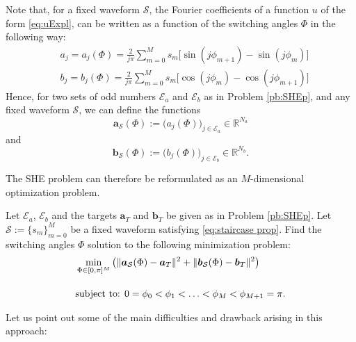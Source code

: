\documentclass[twocolumn]{autart}    %
\begin{document}
Note that, for a fixed waveform $\mathcal{S}$, the Fourier coefficients of a function $u$ of the form \eqref{eq:uExpl}, can be written as a function of the switching angles $\Phi$ in the following way:
\begin{align*}
	& a_j = a_j(\Phi) =  \frac{2}{j\pi} \sum_{m=0}^{M} s_m \Big[\sin(j\phi_{m+1}) -\sin(j\phi_{m})\Big]
	\\
	& b_j = b_j(\Phi) = \frac{2}{j\pi} \sum_{m=0}^{M} s_m \Big[\cos(j\phi_{m}) -\cos(j\phi_{m+1})\Big]
\end{align*}
Hence,  for  two sets of odd numbers $\mathcal{E}_a$ and $\mathcal{E}_b$ as in Problem \ref{pb:SHEp},  and any fixed waveform $\mathcal{S}$, we can define the functions
\begin{equation}\label{a function of phi}
\bm{a}_\mathcal{S} (\Phi) := \big(a_j (\Phi)\big)_{j\in \mathcal{E}_a} \in \mathbb{R}^{N_a}
\end{equation}
and
\begin{equation}\label{a function of phi}
\bm{b}_\mathcal{S} (\Phi) := \big(b_j (\Phi)\big)_{j\in \mathcal{E}_b} \in \mathbb{R}^{N_b}.
\end{equation}

The SHE problem can therefore be reformulated as an $M$-dimensional optimization problem.

\bigskip

\begin{problem}\label{pb:SHE opt}
Let $\mathcal{E}_a$, $\mathcal{E}_b$ and the targets $\bm{a}_T$ and $\bm{b}_T$ be given as in Problem \ref{pb:SHEp}.  Let $\mathcal S := \{ s_m\}_{m=0}^M$ be a fixed waveform satisfying \eqref{eq:staircase prop}.  Find the switching angles $\Phi$ solution to the following minimization problem:
\begin{align}
	&\min_{\Phi \in [0,\pi]^{M}} \left( \|\bm{a}_\mathcal{S} (\Phi) - \bm{a}_T\|^2 + \| \bm{b}_\mathcal{S} (\Phi) - \bm{b}_T\|^2\right)\notag 
	\\[10pt]
	&\mbox{subject to: } 0 = \phi_0 <\phi_1 < \ldots < \phi_{M} < \phi_{M+1} = \pi. \notag 
\end{align}
\end{problem}

Let us point out some of the main difficulties and drawback arising in this approach: 
\end{document}
